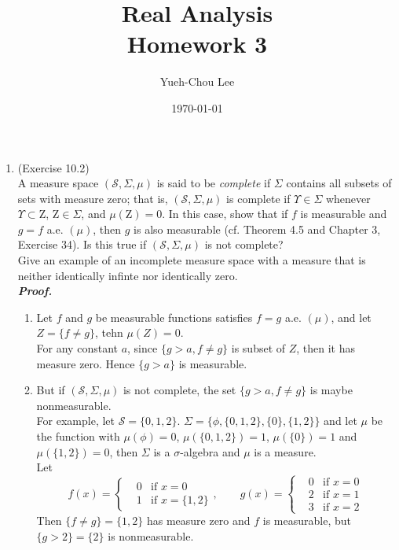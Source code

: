 \documentclass[a4paper,11pt]{article}
\title{Real Analysis \\ Homework 3}
\author{Yueh-Chou Lee}
\date{\today}
\begin{document}
\maketitle
\begin{enumerate}

	\item (Exercise 10.2)\\
		A measure space $(\mathscr{S}, \Sigma, \mu)$ is said to be \textit{complete} if $\Sigma$ contains all subsets of sets with measure zero; that is, $(\mathscr{S}, \Sigma, \mu)$ is complete if $\Upsilon \in \Sigma$ whenever $\Upsilon \subset \mathrm{Z}$, $\mathrm{Z} \in \Sigma$, and $\mu(\mathrm{Z}) = 0$. In this case, show that if $f$ is measurable and $g = f$ a.e. $(\mu)$, then $g$ is also measurable (cf. Theorem 4.5 and Chapter 3, Exercise 34). Is this true if $(\mathscr{S}, \Sigma, \mu)$ is not complete?\\
		Give an example of an incomplete measure space with a measure that is neither identically infinte nor identically zero.\\
	\newline
	\textit{\textbf {Proof.}}\\
		\begin{enumerate}
			\item
				Let $f$ and $g$ be measurable functions satisfies $f = g$ a.e. $(\mu)$, and let $Z = \{f \neq g\}$, tehn $\mu(Z) = 0$.\\
				For any constant $a$, since $\{g > a, f \neq g\}$ is subset of $Z$, then it has measure zero. Hence $\{g >a\}$ is measurable.\\

			\item
				But if $(\mathscr{S}, \Sigma, \mu)$ is not complete, the set $\{g > a, f \neq g\}$ is maybe nonmeasurable.\\
				For example, let $\mathscr{S} = \{0,1,2\}$. $\Sigma = \{\phi, \{0,1,2\}, \{0\}, \{1,2\} \}$ and let $\mu$ be the function with $\mu(\phi) = 0$, $\mu(\{0,1,2\}) = 1$, $\mu(\{0\}) = 1$ and $\mu(\{1,2\}) = 0$, then $\Sigma$ is a $\sigma$-algebra and $\mu$ is a measure.\\
				Let
					$$f(x) = \left\{
					\begin{matrix}
					&0 &\text{if $x = 0$} \\
					&1 &\text{if $x = \{1,2\}$}
					\end{matrix}\right.,
					\quad \quad
					g(x) = \left\{
					\begin{matrix}
					&0 &\text{if $x = 0$}\\
					&2 &\text{if $x = 1$}\\
					&3 &\text{if $x = 2$}
					\end{matrix}\right.$$
				Then $\{ f \neq g\} = \{1, 2\}$ has measure zero and $f$ is measurable, but $\{g > 2\} = \{2\}$ is nonmeasurable.\\


\end{enumerate}
\end{enumerate}
\end{document}
